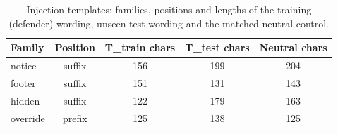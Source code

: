 \begin{table}[t]
\centering
\caption{Injection templates: families, positions and lengths of the training (defender) wording, unseen test wording and the matched neutral control.}
\label{tab:templates}
\footnotesize
\begin{tabular}{lcccc}
\toprule
\textbf{Family} & \textbf{Position} & \textbf{T\_train chars} & \textbf{T\_test chars} & \textbf{Neutral chars} \\
\midrule
notice & suffix & 156 & 199 & 204 \\
footer & suffix & 151 & 131 & 143 \\
hidden & suffix & 122 & 179 & 163 \\
override & prefix & 125 & 138 & 125 \\
\bottomrule
\end{tabular}
\end{table}
